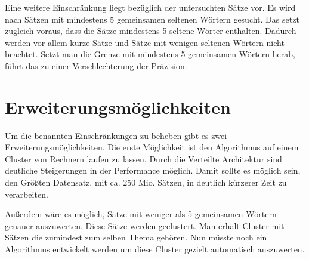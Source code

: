 \documentclass[a4paper,11pt,utf8]{scrartcl}
\begin{document}
Eine weitere Einschränkung liegt bezüglich der untersuchten Sätze vor. Es wird nach Sätzen mit mindestens 5 gemeinsamen seltenen Wörtern gesucht. Das setzt zugleich voraus, dass die Sätze mindestens 5 seltene Wörter enthalten. Dadurch werden vor allem kurze Sätze und Sätze mit wenigen seltenen Wörtern nicht beachtet. Setzt man die Grenze mit mindestens 5 gemeinsamen Wörtern herab, führt das zu einer Verschlechterung der Präzision. 

\section{Erweiterungsmöglichkeiten}
Um die benannten Einschränkungen zu beheben gibt es zwei Erweiterungsmöglichkeiten. Die erste Möglichkeit ist den Algorithmus auf einem Cluster von Rechnern laufen zu lassen. Durch die Verteilte Architektur sind deutliche Steigerungen in der Performance möglich. Damit sollte es möglich sein, den Größten Datensatz, mit ca. 250 Mio. Sätzen, in deutlich kürzerer Zeit zu verarbeiten.

Außerdem wäre es möglich, Sätze mit weniger als 5 gemeinsamen Wörtern genauer auszuwerten. Diese Sätze werden geclustert. Man erhält Cluster mit Sätzen die zumindest zum selben Thema gehören. Nun müsste noch ein Algorithmus entwickelt werden um diese Cluster gezielt automatisch auszuwerten. 
\end{document}
